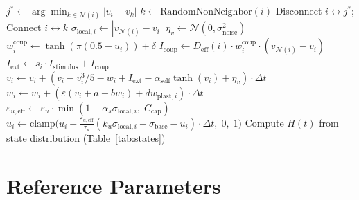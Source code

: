 \documentclass[11pt]{article}
\begin{document}
\begin{algorithm}[ht]
\caption{Time-step update for the doubt-modulated FHN network.}
\begin{algorithmic}[1]
    \STATE {}
        \STATE $j^* \leftarrow \arg\min_{k \in \mathcal{N}(i)} |v_i - v_k|$
        \STATE $k \leftarrow \text{RandomNonNeighbor}(i)$
        \STATE Disconnect $i \leftrightarrow j^*$; Connect $i \leftrightarrow k$
    \ENDFOR
        \STATE $\sigma_{\text{local},i} \leftarrow |\bar{v}_{\mathcal{N}(i)} - v_i|$
        \STATE $\eta_v \leftarrow \mathcal{N}(0, \sigma_{\text{noise}}^2)$
        \STATE $w_i^{\text{coup}} \leftarrow \tanh(\pi(0.5 - u_i)) + \delta$
        \STATE $I_{\text{coup}} \leftarrow D_{\text{eff}}(i) \cdot w_i^{\text{coup}} \cdot (\bar{v}_{\mathcal{N}(i)} - v_i)$
        \STATE $I_{\text{ext}} \leftarrow s_i \cdot I_{\text{stimulus}} + I_{\text{coup}}$ 
        \STATE $v_i \leftarrow v_i + (v_i - v_i^3/5 - w_i + I_{\text{ext}} - \alpha_{\text{self}} \tanh(v_i) + \eta_v) \cdot \Delta t$
        \STATE $w_i \leftarrow w_i + (\varepsilon(v_i + a - bw_i) + dw_{\text{plast},i}) \cdot \Delta t$
        \STATE $\varepsilon_{u,\text{eff}} \leftarrow \varepsilon_u \cdot \min(1 + \alpha_s \sigma_{\text{local},i},\; C_{\text{cap}})$
        \STATE $u_i \leftarrow \text{clamp}\!\bigl(u_i + \frac{\varepsilon_{u,\text{eff}}}{\tau_u}(k_u \sigma_{\text{local},i} + \sigma_{\text{base}} - u_i) \cdot \Delta t,\; 0,\; 1\bigr)$
    \ENDFOR
    \STATE Compute $H(t)$ from state distribution (Table~\ref{tab:states})
\ENDFOR
\end{algorithmic}
\end{algorithm}

\section{Reference Parameters}
\label{app:parameters}
\end{document}
